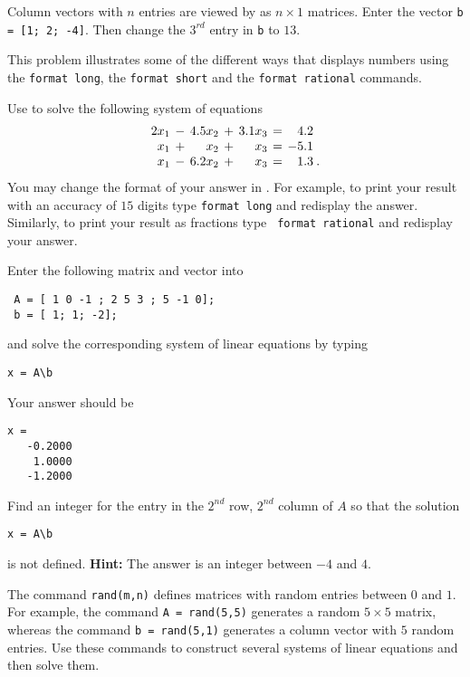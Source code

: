 \begin{exercise} \label{c2.1.3}
Column vectors with $n$ entries are viewed by \Matlab as
$n\times 1$ matrices.  Enter the vector {\tt b = [1; 2; -4]}.
Then change the $3^{rd}$ entry in {\tt b} to $13$.
\end{exercise}


\begin{exercise} \label{c2.1.4}
This problem illustrates some of the different ways that \Matlab
displays numbers using the {\tt format long}, the {\tt format short} and
the {\tt format rational} commands.

Use \Matlab to solve the following system of equations
\[
\arraycolsep 2pt
\begin{array}{rcrcrcrl}
 2x_1 & - & 4.5x_2 & + & 3.1x_3 & = &   4.2  & \\
  x_1 & + &  x_2 & + &  x_3 & = &  -5.1  & \\
  x_1 & - & 6.2x_2 & + &  x_3 & = &  1.3  & \! .
\end{array}
\]
You may change the format of your answer in \Matlabp.  For
example, to print your result with an accuracy of $15$ digits
type {\tt format long}  and redisplay the
answer.  Similarly, to print your result as fractions type {\tt
format rational}  and redisplay your
answer.
\end{exercise}

\begin{exercise} \label{c2.1.5}
Enter the following matrix and vector into \Matlab
\begin{verbatim}
 A = [ 1 0 -1 ; 2 5 3 ; 5 -1 0];
 b = [ 1; 1; -2];
\end{verbatim}
and solve the corresponding system of linear equations by typing
\begin{verbatim}
x = A\b
\end{verbatim}
Your answer should be
\begin{verbatim}
x =
   -0.2000
    1.0000
   -1.2000
\end{verbatim}
Find an integer for the entry in the $2^{nd}$ row, $2^{nd}$ column
of $A$ so that the solution
\begin{verbatim}
x = A\b
\end{verbatim}
is not defined.  {\bf Hint:} The answer is an integer between
$-4$ and $4$.
\end{exercise}

\begin{exercise} \label{c2.1.6}
The \Matlab command {\tt rand(m,n)} defines
matrices with random
entries between $0$ and $1$.  For example, the command {\tt A =
rand(5,5)} generates a random $5\times 5$ matrix, whereas the
command {\tt b = rand(5,1)} generates a column vector with $5$
random entries.  Use these commands to construct several systems
of linear equations and then solve them.
\end{exercise}

